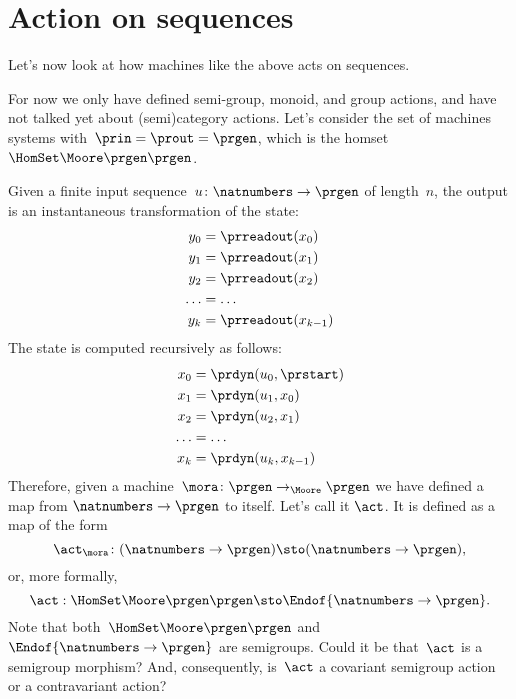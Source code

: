 \section{Action on sequences}

Let's now look at how machines like the above acts on sequences.

For now we only have defined semi-group, monoid, and group actions, and have not talked yet about (semi)category actions.
Let's consider the set of machines systems with~$\prin = \prout = \prgen$, which is the homset~$\HomSet\Moore\prgen\prgen$.

Given a finite input sequence~$u\colon \natnumbers \to \prgen$ of length~$n$, the output is an instantaneous transformation of the state:
%
\begin{equation}
    \label{eq:actions-on-sequences-y}
    \begin{aligned}
        y_0   & = \prreadout(x_0)     \\
        y_1   & = \prreadout(x_1)     \\
        y_2   & = \prreadout(x_2)     \\
        \dots & = \dots               \\
        y_{k} & = \prreadout(x_{k-1}) 
    \end{aligned}
\end{equation}
%
The state is computed recursively as follows:
\begin{equation}
    \label{eq:actions-on-sequences-x}
    \begin{aligned}
        x_0   & = \prdyn(u_0, \prstart)  \\
        x_1   & = \prdyn(u_1, x_0)       \\
        x_2   & = \prdyn(u_2, x_1)       \\
        \dots & = \dots                  \\
        x_{k} & = \prdyn(u_{k}, x_{k-1}) 
    \end{aligned}
\end{equation}
%
Therefore, given a machine~$\mora \colon \prgen \to_{\Moore} \prgen$ we have defined a map from $\natnumbers \to \prgen$ to itself.
Let's call it $\act$.
It is defined as a map of the form
%
\begin{equation}
    \label{eq:actions-on-sequences-1}
    \act_{\mora}\colon  (\natnumbers \to \prgen)  \sto  (\natnumbers \to \prgen),
\end{equation}
%
or, more formally,
%
\begin{equation}
    \label{eq:actions-on-sequences-2}
    \act: \HomSet\Moore\prgen\prgen \sto \Endof {\natnumbers \to \prgen}.
\end{equation}
%
Note that both~$\HomSet\Moore\prgen\prgen$ and $\Endof {\natnumbers \to \prgen}$ are semigroups.
Could it be that~$\act$ is a semigroup morphism?
And, consequently, is~$\act$ a covariant semigroup action or a contravariant action?

